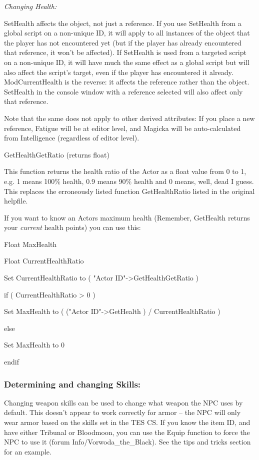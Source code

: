 \documentclass[
]{article}
\begin{document}
\emph{Changing Health:}

SetHealth affects the object, not just a reference. If you use SetHealth
from a global script on a non-unique ID, it will apply to all instances
of the object that the player has not encountered yet (but if the player
has already encountered that reference, it won't be affected). If
SetHealth is used from a targeted script on a non-unique ID, it will
have much the same effect as a global script but will also affect the
script's target, even if the player has encountered it already.
ModCurrentHealth is the reverse: it affects the reference rather than
the object. SetHealth in the console window with a reference selected
will also affect only that reference.

Note that the same does not apply to other derived attributes: If you
place a new reference, Fatigue will be at editor level, and Magicka will
be auto-calculated from Intelligence (regardless of editor level).

GetHealthGetRatio (returns float)

This function returns the health ratio of the Actor as a float value
from 0 to 1, e.g. 1 means 100\% health, 0.9 means 90\% health and 0
means, well, dead I guess. This replaces the erroneously listed function
GetHealthRatio listed in the original helpfile.

If you want to know an Actors maximum health (Remember, GetHealth
returns your \emph{current} health points) you can use this:

Float MaxHealth

Float CurrentHealthRatio

Set CurrentHealthRatio to ( "Actor ID"-\textgreater GetHealthGetRatio )

if ( CurrentHealthRatio \textgreater{} 0 )

Set MaxHealth to ( ("Actor ID"-\textgreater GetHealth ) /
CurrentHealthRatio )

else

Set MaxHealth to 0

endif

\hypertarget{determining-and-changing-skills}{%
\subsubsection{Determining and changing
Skills:}\label{determining-and-changing-skills}}

Changing weapon skills can be used to change what weapon the NPC uses by
default. This doesn't appear to work correctly for armor -- the NPC will
only wear armor based on the skills set in the TES CS. If you know the
item ID, and have either Tribunal or Bloodmoon, you can use the Equip
function to force the NPC to use it (forum Info/Vorwoda\_the\_Black).
See the tips and tricks section for an example.
\end{document}
